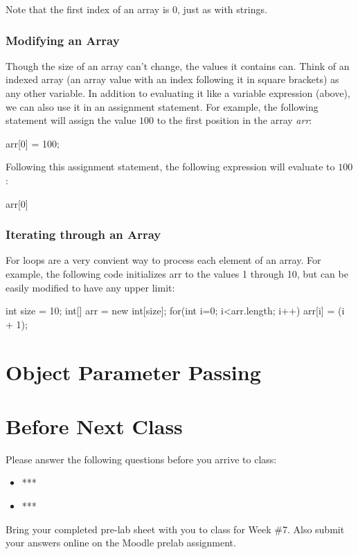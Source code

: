Note that the first index of an array is 0, just as with strings.

\subsubsection{Modifying an Array}

Though the size of an array can't change, the values it contains can. Think of an indexed array (an array value with an index following it in square brackets) as any other variable. In addition to evaluating it like a variable expression (above), we can also use it in an assignment statement. For example, the following statement will assign the value $100$ to the first position in the array \textit{arr}:

\begin{code}
arr[0] = 100;
\end{code}

Following this assignment statement, the following expression will evaluate to $100$:

\begin{code}
arr[0]
\end{code}


\subsubsection{Iterating through an Array}

For loops are a very convient way to process each element of an array. For example, the following code initializes arr to the values 1 through 10, but can be easily modified to have any upper limit:

\begin{code}
int size = 10;
int[] arr = new int[size];
for(int i=0; i<arr.length; i++) {
  arr[i] = (i + 1);
}
\end{code}


\section{Object Parameter Passing}


\section{Before Next Class}

Please answer the following questions before you arrive to class:

\begin{exer}

\begin{itemize}

\item ***

  \evalline
  
\item ***

  \evalline
  
\end{itemize}

\end{exer}

Bring your completed pre-lab sheet with you to class for Week \#7. Also submit your answers online on the Moodle prelab assignment.  

